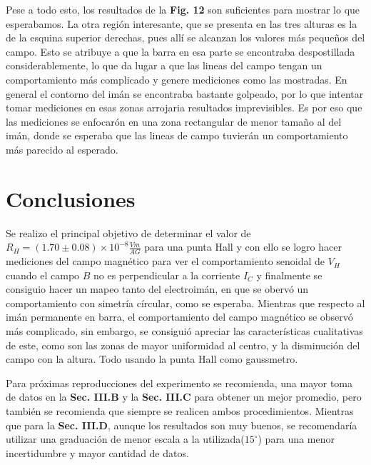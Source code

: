 \documentclass[twocolumn,showpacs,preprintnumbers,amsmath,amssymb]{revtex4-1}
\begin{document}
Pese a todo esto,
los resultados de la \textbf{Fig. 12} son suficientes para mostrar lo que esperabamos. La otra región interesante, que se
presenta en las tres alturas es la de la esquina superior derechas, pues allí se alcanzan los valores más pequeños del campo.
Esto se atribuye a que la barra en esa parte se encontraba despostillada considerablemente, lo que da lugar a que las lineas del
campo tengan un comportamiento más complicado y genere mediciones como las mostradas. En general el contorno del imán se
encontraba bastante golpeado, por lo que intentar tomar mediciones en esas zonas arrojaria resultados imprevisibles. Es por
eso que las mediciones se enfocarón en una zona rectangular de menor tamaño al del imán, donde se esperaba que las lineas
de campo tuvierán un comportamiento más parecido al esperado.



\section{Conclusiones}

Se realizo el principal objetivo de determinar el valor de $R_H = (1.70 \pm 0.08)\times10^{-8} \frac{Vm}{AG}$ para una punta
Hall y con ello se logro hacer mediciones del campo magnético para ver el comportamiento senoidal de $V_H$ cuando el campo
$B$ no es perpendicular a la corriente $I_C$ y finalmente se consiguio hacer un mapeo tanto del electroimán, en que se obervó
un comportamiento con simetría círcular, como se esperaba. Mientras que respecto al imán permanente en barra, el comportamiento
del campo magnético se observó más complicado, sin embargo, se consiguió apreciar las características cualitativas de este, como
son las zonas de mayor uniformidad al centro, y la disminución del campo con la altura. Todo usando la punta Hall como gaussmetro.

Para próximas reproducciones del experimento se recomienda, una mayor toma de datos en la \textbf{Sec. III.B} y la \textbf{Sec. III.C}
para obtener un mejor promedio, pero también se recomienda que siempre se realicen ambos procedimientos.
Mientras que para la \textbf{Sec. III.D}, aunque los resultados son muy buenos, se recomendaría utilizar una graduación de menor escala
a la utilizada($15^\circ$) para una menor incertidumbre y mayor cantidad de datos.
\end{document}
